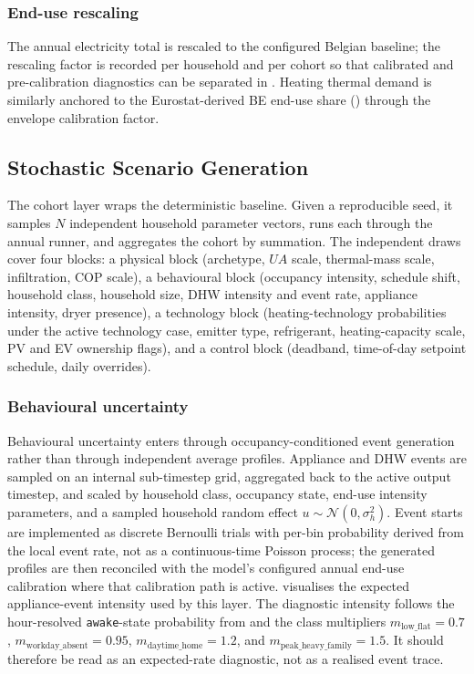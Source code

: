 \subsubsection*{End-use rescaling}
The annual electricity total is rescaled to the configured Belgian baseline; the rescaling factor is recorded per household and per cohort so that calibrated and pre-calibration diagnostics can be separated in . Heating thermal demand is similarly anchored to the Eurostat-derived BE end-use share () through the envelope calibration factor.



\subsection{Stochastic Scenario Generation}
\label{sec:stochasticScenarioGeneration}

The cohort layer wraps the deterministic baseline. Given a reproducible seed, it samples $N$ independent household parameter vectors, runs each through the annual runner, and aggregates the cohort by summation. The independent draws cover four blocks: a physical block (archetype, $UA$ scale, thermal-mass scale, infiltration, COP scale), a behavioural block (occupancy intensity, schedule shift, household class, household size, DHW intensity and event rate, appliance intensity, dryer presence), a technology block (heating-technology probabilities under the active technology case, emitter type, refrigerant, heating-capacity scale, PV and EV ownership flags), and a control block (deadband, time-of-day setpoint schedule, daily overrides).

\subsubsection*{Behavioural uncertainty}
Behavioural uncertainty enters through occupancy-conditioned event generation rather than through independent average profiles. Appliance and DHW events are sampled on an internal sub-timestep grid, aggregated back to the active output timestep, and scaled by household class, occupancy state, end-use intensity parameters, and a sampled household random effect $u \sim \mathcal{N}(0,\sigma_h^2)$. Event starts are implemented as discrete Bernoulli trials with per-bin probability derived from the local event rate, not as a continuous-time Poisson process; the generated profiles are then reconciled with the model's configured annual end-use calibration where that calibration path is active.
\newline {} visualises the expected appliance-event intensity used by this layer. The diagnostic intensity follows the hour-resolved \texttt{awake}-state probability from  and the class multipliers $m_{\text{low\_flat}}=0.7$, $m_{\text{workday\_absent}}=0.95$, $m_{\text{daytime\_home}}=1.2$, and $m_{\text{peak\_heavy\_family}}=1.5$. It should therefore be read as an expected-rate diagnostic, not as a realised event trace.

